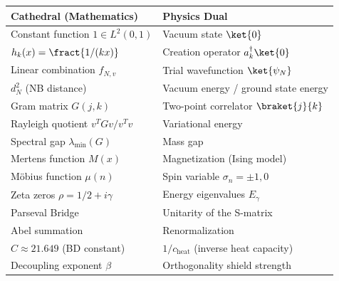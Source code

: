 \begin{correspondence}
\label{corr:master}
\begin{center}
\begin{tabular}{@{}ll@{}}
\toprule
\textbf{Cathedral (Mathematics)} & \textbf{Physics Dual} \\
\midrule
Constant function $1 \in L^2(0,1)$ & Vacuum state $\ket{0}$ \\
$h_k(x) = \fract{1/(kx)}$ & Creation operator $a_k^\dagger \ket{0}$ \\
Linear combination $f_{N,v}$ & Trial wavefunction $\ket{\psi_N}$ \\
$d_N^2$ (NB distance) & Vacuum energy / ground state energy \\
Gram matrix $G(j,k)$ & Two-point correlator $\braket{j}{k}$ \\
Rayleigh quotient $v^T G v / v^T v$ & Variational energy \\
Spectral gap $\lambda_{\min}(G)$ & Mass gap \\
Mertens function $M(x)$ & Magnetization (Ising model) \\
M\"obius function $\mu(n)$ & Spin variable $\sigma_n = \pm 1, 0$ \\
Zeta zeros $\rho = 1/2 + i\gamma$ & Energy eigenvalues $E_\gamma$ \\
Parseval Bridge & Unitarity of the S-matrix \\
Abel summation & Renormalization \\
$C \approx 21.649$ (BD constant) & $1/c_{\text{heat}}$ (inverse heat capacity) \\
Decoupling exponent $\beta$ & Orthogonality shield strength \\
\bottomrule
\end{tabular}
\end{center}
\end{correspondence}

